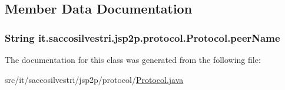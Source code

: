 \subsection{\-Member \-Data \-Documentation}
\hypertarget{classit_1_1saccosilvestri_1_1jsp2p_1_1protocol_1_1_protocol_a6dcf1366f63023a80091ab663ecd3060}{
\subsubsection[{peer\-Name}]{\setlength{\rightskip}{0pt plus 5cm}\-String {\bf it.\-saccosilvestri.\-jsp2p.\-protocol.\-Protocol.\-peer\-Name}}}
\label{classit_1_1saccosilvestri_1_1jsp2p_1_1protocol_1_1_protocol_a6dcf1366f63023a80091ab663ecd3060}


\-The documentation for this class was generated from the following file\-:\begin{DoxyCompactItemize}
\item 
src/it/saccosilvestri/jsp2p/protocol/\hyperlink{_protocol_8java}{\-Protocol.\-java}\end{DoxyCompactItemize}
